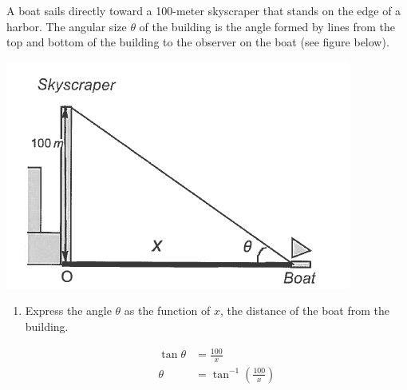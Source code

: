 \documentclass[nooutcomes]{ximera}
\begin{document}
\begin{problem}
A boat sails directly toward a 100-meter skyscraper that stands on the edge of a harbor.  The angular size $\theta$ of the building is the angle formed by lines from the top and bottom of the building to the observer on the boat (see figure below).
    \begin{image}
      \includegraphics[scale = 0.7]{figure6.png}
    \end{image}

\begin{enumerate}
	\item Express the angle $\theta$ as the function of $x$, the distance of the boat from the building.
	\begin{freeResponse}
	\begin{align*}
	\tan\theta&=\frac{100}{x}\\
	\theta&=\tan^{-1}\left( \frac{100}{x} \right)
	\end{align*}
	\end{freeResponse}
	

\end{enumerate}
\end{problem}
\end{document}
